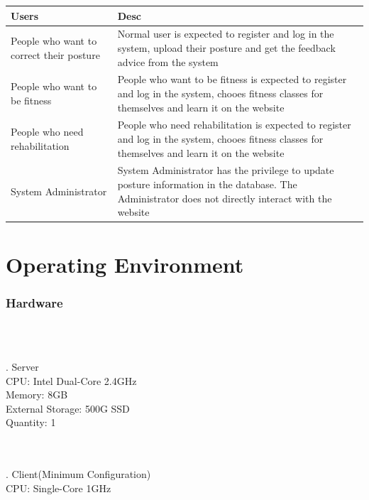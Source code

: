 \documentclass[16pt]{scrreprt}
\begin{document}
\begin{center}
    \begin{tabular}{p{5cm}p{11cm}}
        \hline
	    Users & Desc\\
        \hline
	    People who want to correct their posture &  Normal user is expected to register and log in the system, upload their posture and get the feedback advice from the system\\
        \hline
	    People who want to be fitness & People who want to be fitness is expected to register and log in the system, chooes fitness classes for themselves and learn it on the website\\
        \hline
        People who need rehabilitation & People who need rehabilitation is expected to register and log in the system, chooes fitness classes for themselves and learn it on the website\\
        \hline
        System Administrator & System Administrator has the privilege to update posture information in the database. The Administrator does not directly interact with the website\\
        \hline
    \end{tabular}
\end{center}

\section{Operating Environment}

\subsubsection{Hardware}

\\~

. Server\\

CPU: Intel Dual-Core 2.4GHz\\

Memory: 8GB\\

External Storage: 500G SSD\\

Quantity: 1\\

\\~

. Client(Minimum Configuration)\\

CPU: Single-Core 1GHz\\
\end{document}
